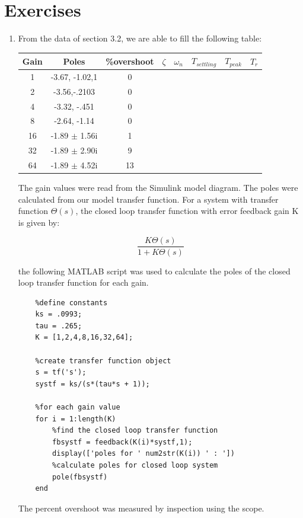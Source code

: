 \documentclass[11pt,a4paper]{article}
\begin{document}
\section{Exercises}
\begin{enumerate}

\item From the data of section 3.2, we are able to fill the following table:


\begin{center}
\begin{tabular}{|c|c|c|c|c|c|c|c|}
\hline
Gain & Poles & \%overshoot & $\zeta$ & $\omega_{n}$ & $T_{settling}$ & $T_{peak}$ & $T_{r}$ \\ \hline
1 & -3.67, -1.02,1 & 0 & \qquad \qquad & \qquad \qquad & \qquad \qquad & \qquad \qquad & \qquad \qquad \\ \hline 
2 & -3.56,-.2103 & 0 & \qquad \qquad & \qquad \qquad & \qquad \qquad & \qquad \qquad & \qquad \qquad \\ \hline 
4 & -3.32, -.451 & 0 & \qquad \qquad & \qquad \qquad & \qquad \qquad & \qquad \qquad & \qquad \qquad \\ \hline 
8 & -2.64, -1.14 & 0 & \qquad \qquad & \qquad \qquad & \qquad \qquad & \qquad \qquad & \qquad \qquad \\ \hline 
16 & -1.89 $\pm$ 1.56i & 1 & \qquad \qquad & \qquad \qquad & \qquad \qquad & \qquad \qquad & \qquad \qquad \\ \hline 
32 & -1.89 $\pm$ 2.90i & 9 & \qquad \qquad & \qquad \qquad & \qquad \qquad & \qquad \qquad & \qquad \qquad \\ \hline 
64 & -1.89 $\pm$ 4.52i & 13 & \qquad \qquad & \qquad \qquad & \qquad \qquad & \qquad \qquad & \qquad \qquad \\ \hline 

\end{tabular}
\end{center}

The gain values were read from the Simulink model diagram. The poles were calculated from our model transfer function. For a system with transfer function $\Theta(s)$, the closed loop transfer function with error feedback gain K is given by:

\begin{equation}
	\frac{K\Theta(s)}{1+K\Theta(s)}
\end{equation}

the following MATLAB script was used to calculate the poles of the closed loop transfer function for each gain.

\begin{verbatim}
	%define constants
	ks = .0993;
	tau = .265;
	K = [1,2,4,8,16,32,64];

	%create transfer function object
	s = tf('s');
	systf = ks/(s*(tau*s + 1));

	%for each gain value
	for i = 1:length(K)
		%find the closed loop transfer function
    	fbsystf = feedback(K(i)*systf,1);
    	display(['poles for ' num2str(K(i)) ' : '])
    	%calculate poles for closed loop system
    	pole(fbsystf)
	end
\end{verbatim}


The percent overshoot was measured by inspection using the scope.

\end{enumerate}
\end{document}
